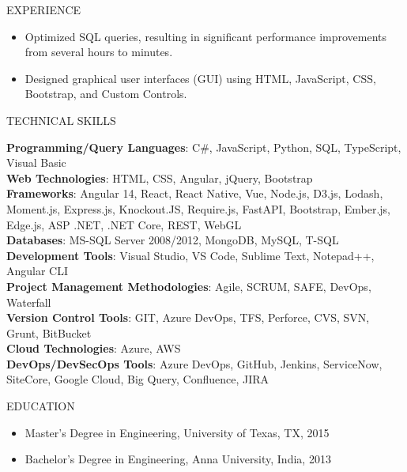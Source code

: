 \documentclass{resume} %
\begin{document}
\begin{rSection}{EXPERIENCE}
\begin{flushleft}
\begin{itemize}
                                    \item Optimized SQL queries, resulting in significant performance improvements from several hours to minutes.
                                    \item Designed graphical user interfaces (GUI) using HTML, JavaScript, CSS, Bootstrap, and Custom Controls.
                            \end{itemize}
            \vspace{0.5em}
            \end{flushleft} 
\end{rSection}

\begin{rSection}{TECHNICAL SKILLS}
    \begin{flushleft}
                    \textbf{Programming/Query Languages}: C\#, JavaScript, Python, SQL, TypeScript, Visual Basic \\
                    \textbf{Web Technologies}: HTML, CSS, Angular, jQuery, Bootstrap \\
                    \textbf{Frameworks}: Angular 14, React, React Native, Vue, Node.js, D3.js, Lodash, Moment.js, Express.js, Knockout.JS, Require.js, FastAPI, Bootstrap, Ember.js, Edge.js, ASP .NET, .NET Core, REST, WebGL \\
                    \textbf{Databases}: MS{-}SQL Server 2008/2012, MongoDB, MySQL, T{-}SQL \\
                    \textbf{Development Tools}: Visual Studio, VS Code, Sublime Text, Notepad++, Angular CLI \\
                    \textbf{Project Management Methodologies}: Agile, SCRUM, SAFE, DevOps, Waterfall \\
                    \textbf{Version Control Tools}: GIT, Azure DevOps, TFS, Perforce, CVS, SVN, Grunt, BitBucket \\
                    \textbf{Cloud Technologies}: Azure, AWS \\
                    \textbf{DevOps/DevSecOps Tools}: Azure DevOps, GitHub, Jenkins, ServiceNow, SiteCore, Google Cloud, Big Query, Confluence, JIRA \\
            \end{flushleft}
\end{rSection}

\begin{rSection}{EDUCATION}
    \begin{flushleft}
    \begin{itemize}
                    \item Master's Degree in Engineering, University of Texas, TX, 2015 \\
                    \item Bachelor's Degree in Engineering, Anna University, India, 2013 \\
            \end{itemize}
    \end{flushleft}
\end{rSection}
\end{document}

